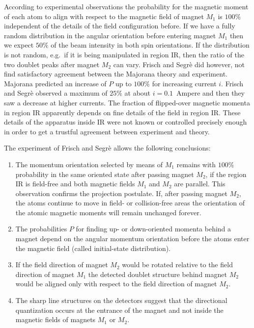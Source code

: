 \documentclass[12pt]{article}
\begin{document}
According to experimental observations the probability for the magnetic moment of each atom to align with respect to the magnetic field of magnet $M_1$ is $100\%$ independent of the details of the field configuration before. If we have a fully random distribution in the angular orientation before entering magnet $M_1$ then we expect $50\%$ of the beam intensity in both spin orientations. If the distribution is not random, e.g.\ if it is being manipulated in region IR, then the ratio of the two doublet peaks after magnet $M_2$ can vary. Frisch and Segrè did however, not find satisfactory agreement between the Majorana theory and experiment. Majorana predicted an increase of $P$ up to $100\%$ for increasing current $i$. Frisch and Segrè observed a maximum of $25\%$ at about $i=0.1$~Ampere and then they saw a decrease at higher currents. The fraction of flipped-over magnetic momenta in region IR apparently depends on fine details of the field in region IR. These details of the apparatus inside IR were not known or controlled precisely enough in order to get a trustful agreement between experiment and theory.

The experiment of Frisch and Segrè allows the following conclusions: 
\begin{enumerate}
\item The momentum orientation selected by means of $M_1$ remains with $100\%$ probability in the same oriented state after passing magnet $M_2$, if the region IR is field-free and both magnetic fields $M_1$ and $M_2$ are parallel. This observation confirms the projection postulate. If, after passing magnet $M_2$, the atoms continue to move in field- or collision-free areas the orientation of the atomic magnetic moments will remain unchanged forever. 
\item The probabilities $P$ for finding up- or down-oriented momenta behind a magnet depend on the angular momentum orientation before the atoms enter the magnetic field (called initial-state distribution). 
\item If the field direction of magnet $M_2$ would be rotated relative to the field direction of magnet $M_1$ the detected doublet structure behind magnet $M_2$ would be aligned only with respect to the field direction of magnet $M_2$. 
\item The sharp line structures on the detectors suggest that the directional quantization occurs at the entrance of the magnet and not inside the magnetic fields of magnets $M_1$ or $M_2$. 
\end{enumerate}
\end{document}
